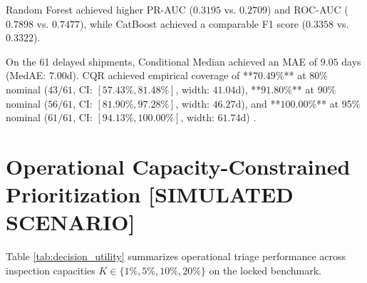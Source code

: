 \documentclass[11pt,a4paper]{article}
\begin{document}
Random Forest achieved higher PR-AUC ($0.3195$ vs. $0.2709$) and ROC-AUC ($0.7898$ vs. $0.7477$), while CatBoost achieved a comparable F1 score ($0.3358$ vs. $0.3322$). 

On the 61 delayed shipments, Conditional Median achieved an MAE of $9.05$ days (MedAE: $7.00$d). CQR achieved empirical coverage of **$70.49\%$** at 80\% nominal ($43/61$, CI: $[57.43\%, 81.48\%]$, width: $41.04$d), **$91.80\%$** at 90\% nominal ($56/61$, CI: $[81.90\%, 97.28\%]$, width: $46.27$d), and **$100.00\%$** at 95\% nominal ($61/61$, CI: $[94.13\%, 100.00\%]$, width: $61.74$d) \cite{clopper1934use}.

\section{Operational Capacity-Constrained Prioritization [SIMULATED SCENARIO]}
Table \ref{tab:decision_utility} summarizes operational triage performance across inspection capacities $K \in \{1\%, 5\%, 10\%, 20\%\}$ on the locked benchmark.
\end{document}
